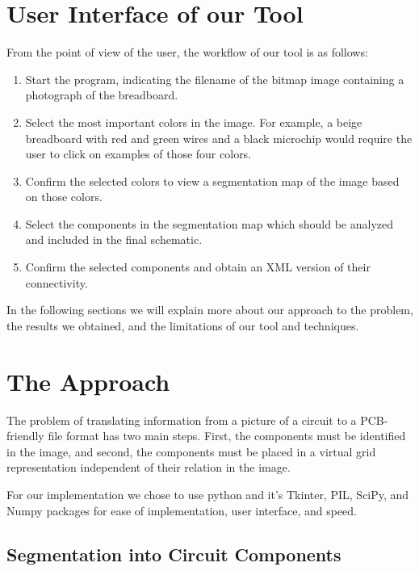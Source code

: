 \documentclass[10pt,twocolumn,letterpaper]{article}
\begin{document}

\section{User Interface of our Tool}

From the point of view of the user, the workflow of our tool is as
follows:

\begin{enumerate}
\item Start the program, indicating the filename of the bitmap image
  containing a photograph of the breadboard.
\item Select the most important colors in the image. For example, a
  beige breadboard with red and green wires and a black microchip
  would require the user to click on examples of those four colors.
\item Confirm the selected colors to view a segmentation map of the image
  based on those colors.
\item Select the components in the segmentation map which should be
  analyzed and included in the final schematic.
\item Confirm the selected components and obtain an XML version of
  their connectivity.
\end{enumerate}

In the following sections we will explain more about our approach to
the problem, the results we obtained, and the limitations of our tool
and techniques.

\section{The Approach}

The problem of translating information from a picture of a circuit to a
PCB-friendly file format has two main steps. First, the components must be
identified in the image, and second, the components must be placed in a virtual
grid representation independent of their relation in the image. 

For our implementation we chose to use python and it's Tkinter, PIL, SciPy, and
Numpy packages for ease of implementation, user interface, and speed. 

\subsection{Segmentation into Circuit Components}
\end{document}
